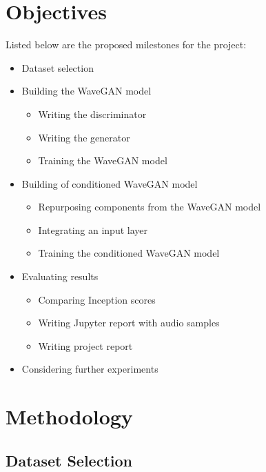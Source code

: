\documentclass[a4paper, titlepage]{article}
\begin{document}
\newpage

\section{Objectives}

Listed below are the proposed milestones for the project:

\begin{itemize}
\item Dataset selection
\item Building the WaveGAN model
  \begin{itemize}
  \item Writing the discriminator
  \item Writing the generator
  \item Training the WaveGAN model
  \end{itemize}
\item Building of conditioned WaveGAN model
  \begin{itemize}
  \item Repurposing components from the WaveGAN model
  \item Integrating an input layer
  \item Training the conditioned WaveGAN model
  \end{itemize}
\item Evaluating results
  \begin{itemize}
  \item Comparing Inception scores
  \item Writing Jupyter report with audio samples
  \item Writing project report
  \end{itemize}
\item Considering further experiments
\end{itemize}

\newpage

\section{Methodology}

\subsection{Dataset Selection}
\end{document}
